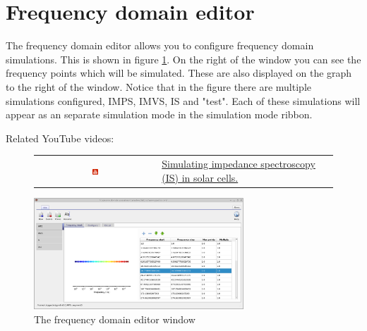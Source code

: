 \section{Frequency domain editor}
The frequency domain editor allows you to configure frequency domain simulations. This is shown in figure \ref{fig:fxdomaineditor}. On the right of the window you can see the frequency points which will be simulated. These are also displayed on the graph to the right of the window.  Notice that in the figure there are multiple simulations configured, IMPS, IMVS, IS and "test".  Each of these simulations will appear as an separate simulation mode in the simulation mode ribbon.

Related YouTube videos:
\begin{figure}[H]

\begin{tabular}{ c l }

\includegraphics[width=0.05\textwidth]{./images/youtube.png}

&
\href{https://www.youtube.com/watch?v=NJAsZeiB5FU}{Simulating impedance spectroscopy (IS) in solar cells.}

\end{tabular}
\end{figure}


\begin{figure}[H]
\centering
\includegraphics[width=0.7\textwidth,height=0.5\textwidth]{./images/fx_domain_editor.png}
\caption{The frequency domain editor window}
\label{fig:fxdomaineditor}
\end{figure}

